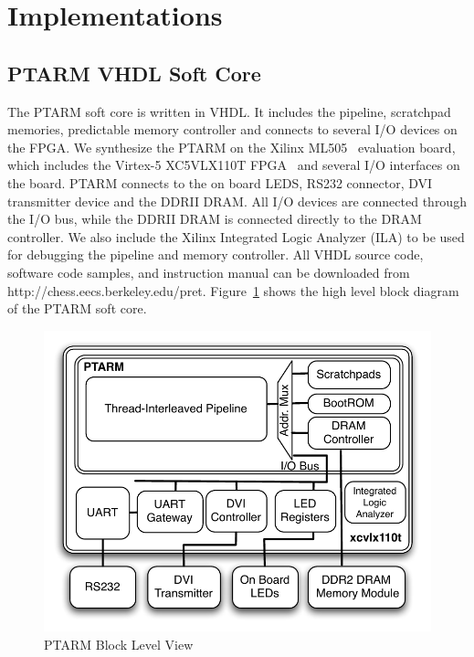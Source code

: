 \section{Implementations}
\subsection{PTARM VHDL Soft Core}
\label{sec:ptarm_vhdl_soft_core}
  
The PTARM soft core is written in VHDL.
It includes the pipeline, scratchpad memories, predictable memory controller and connects to several I/O devices on the FPGA.
We synthesize the PTARM on the Xilinx ML505~\cite{xilinx-ml505} evaluation board, which includes the Virtex-5 XC5VLX110T FPGA~\cite{xilinx-v5-overview} and several I/O interfaces on the board. 
PTARM connects to the on board LEDS, RS232 connector, DVI transmitter device and the DDRII DRAM.
All I/O devices are connected through the I/O bus, while the DDRII DRAM is connected directly to the DRAM controller.
We also include the Xilinx Integrated Logic Analyzer (ILA) to be used for debugging the pipeline and memory controller.
All VHDL source code, software code samples, and instruction manual can be downloaded from http://chess.eecs.berkeley.edu/pret.    
Figure~\ref{fig:ptarm_vhdl_high_level} shows the high level block diagram of the PTARM soft core.

\begin{figure}
  \vspace{-20pt}
  \begin{center}
    \includegraphics[scale=.6]{figs/ptarm_vhdl_high_level}
  \end{center}
  \vspace{-3mm}
  \caption{PTARM Block Level View}
  \label{fig:ptarm_vhdl_high_level}
  \vspace{-10pt}
\end{figure} 

